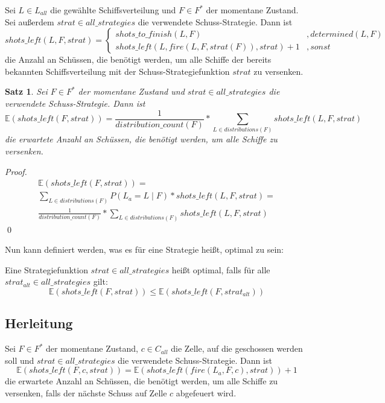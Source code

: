 \documentclass[a4paper,12pt]{llncs}
\numberwithin{equation}{section}
\newtheorem{satz}{Satz}
\begin{document}
\begin{definition}
Sei $L\in L_{all}$ die gewählte Schiffsverteilung und $F\in F^*$ der momentane Zustand.
Sei außerdem $strat \in all\_strategies$ die verwendete Schuss-Strategie.
Dann ist
\[
shots\_left(L, F, strat)=
  \begin{cases} 
  	shots\_to\_finish(L, F) & ,determined(L, F) \\
      shots\_left(L, fire(L, F, strat(F)), strat) + 1 & ,sonst
   \end{cases}
\]
die Anzahl an Schüssen, die benötigt werden, um alle Schiffe der bereits bekannten Schiffsverteilung mit der Schuss-Strategiefunktion $strat$ zu versenken.
\end{definition}

\begin{satz}
Sei $F\in F^*$ der momentane Zustand und $strat \in all\_strategies$ die verwendete Schuss-Strategie.
Dann ist
\[
\mathds{E}(shots\_left(F, strat))=\frac{1}{distribution\_count(F)} * \sum_{L \in distributions(F)}{shots\_left(L, F, strat)}
\]
die erwartete Anzahl an Schüssen, die benötigt werden, um alle Schiffe zu versenken.
\end{satz}

\begin{proof}
\begin{align}
\mathds{E}(shots\_left(F, strat))=\\
\sum_{L \in distributions(F)}{P(L_a= L \mid F) * shots\_left(L, F, strat)} =\\
\frac{1}{distribution\_count(F)} * \sum_{L \in distributions(F)}{shots\_left(L, F, strat)}
\end{align}
\qed
\end{proof}

Nun kann definiert werden, was es für eine Strategie heißt, optimal zu sein:
\begin{definition}
Eine Strategiefunktion $strat \in all\_strategies$ heißt optimal, falls für alle $strat_{alt} \in all\_strategies$ gilt:
\[
\mathds{E}(shots\_left(F, strat)) \leq \mathds{E}(shots\_left(F, strat_{alt}))
\]
\end{definition}

\subsection{Herleitung}

\begin{lemma}
Sei $F\in F^*$ der momentane Zustand, $c\in C_{all}$ die Zelle, auf die geschossen werden soll und $strat \in all\_strategies$ die verwendete Schuss-Strategie.
Dann ist
\[
\mathds{E}(shots\_left(F, c, strat))=\mathds{E}(shots\_left(fire(L_a, F, c), strat)) + 1
\]
die erwartete Anzahl an Schüssen, die benötigt werden, um alle Schiffe zu versenken, falls der nächste Schuss auf Zelle $c$ abgefeuert wird.
\end{lemma}
\end{document}
